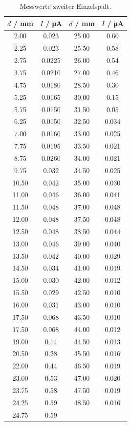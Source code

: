 \begin{table}
  \centering
  \caption{Messwerte zweiter Einzelspalt.}
  \label{tab:2}
  \begin{tabular}{c c || c c}
    \toprule
    $d$ / \si{\milli\meter} & $I$ / \si{\micro\ampere} & $d$ / \si{\milli\meter} & $I$ / \si{\micro\ampere} \\
    \midrule
    2.00 & 0.023  & 25.00 & 0.60  \\
    2.25 & 0.023  & 25.50 & 0.58  \\
    2.75 & 0.0225 & 26.00 & 0.54  \\
    3.75 & 0.0210 & 27.00 & 0.46  \\
    4.75 & 0.0180 & 28.50 & 0.30  \\
    5.25 & 0.0165 & 30.00 & 0.15  \\
    5.75 & 0.0150 & 31.50 & 0.05  \\
    6.25 & 0.0150 & 32.50 & 0.034 \\
    7.00 & 0.0160 & 33.00 & 0.025 \\
    7.75 & 0.0195 & 33.50 & 0.021 \\
    8.75 & 0.0260 & 34.00 & 0.021 \\
    9.75 & 0.032  & 34.50 & 0.025 \\
    10.50 & 0.042 & 35.00 & 0.030 \\
    11.00 & 0.046 & 36.00 & 0.041 \\
    11.50 & 0.048 & 37.00 & 0.048 \\
    12.00 & 0.048 & 37.50 & 0.048 \\
    12.50 & 0.048 & 38.50 & 0.044 \\
    13.00 & 0.046 & 39.00 & 0.040 \\
    13.50 & 0.042 & 40.00 & 0.029 \\
    14.50 & 0.034 & 41.00 & 0.019 \\
    15.00 & 0.030 & 42.00 & 0.012 \\
    15.50 & 0.029 & 42.50 & 0.010 \\
    16.00 & 0.031 & 43.00 & 0.010 \\
    17.50 & 0.068 & 43.50 & 0.010 \\
    17.50 & 0.068 & 44.00 & 0.012 \\
    19.00 & 0.14 & 44.50 & 0.013 \\
    20.50 & 0.28 & 45.50 & 0.016 \\
    22.00 & 0.44 & 46.50 & 0.019 \\
    23.00 & 0.53 & 47.00 & 0.020 \\
    23.75 & 0.58 & 47.50 & 0.019 \\
    24.25 & 0.59 & 48.50 & 0.016 \\
    24.75 & 0.59 &  &  \\
    \bottomrule
  \end{tabular}
\end{table}


